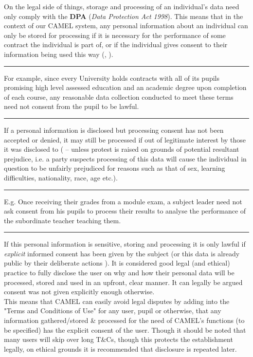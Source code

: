 On the legal side of things, storage and processing of an individual’s data need only comply with the \textbf{DPA} (\textit{Data Protection Act 1998}). This means that in the context of our CAMEL system, any personal information about an individual can only be stored for processing if it is necessary for the performance of some contract the individual is part of, or if the individual gives consent to their information being used this way (\cite{DPA:tDPP:S1}, \cite{DPA:tDPP:S2}).
\vspace{0.35cm} \hrule {\raggedleft \scriptsize For example, since every University holds contracts with all of its pupils promising high level assessed education and an academic degree upon completion of each course, any reasonable data collection conducted to meet these terms need not consent from the pupil to be lawful.\par} \vspace{0.35cm} \hrule
If a personal information is disclosed but processing consent has not been accepted or denied, it may still be processed if out of legitimate interest by those it was disclosed to (\cite{DPA:tDPP:S2} -- unless protest is raised on grounds of potential resultant prejudice, i.e. a party suspects processing of this data will cause the individual in question to be unfairly prejudiced for reasons such as that of sex, learning difficulties, nationality, race, age etc.).
\vspace{0.35cm} \hrule {\raggedleft \scriptsize E.g. Once receiving their grades from a module exam, a subject leader need not ask consent from his pupils to process their results to analyse the performance of the subordinate teacher teaching them.\par} \vspace{0.35cm} \hrule
If this personal information is sensitive, storing and processing it is only lawful if \emph{explicit} informed consent has been given by the subject (or this data is already public by their deliberate actions \cite{DPA:tDPP:S3}). It is considered good legal (and ethical) practice to fully disclose the user on why and how their personal data will be processed, stored and used in an upfront, clear manner. It can legally be argued consent was not given explicitly enough otherwise.
\\This means that CAMEL can easily avoid legal disputes by adding into the "Terms and Conditions of Use" for any user, pupil or otherwise, that any information gathered/stored \& processed for the need of CAMEL’s functions (to be specified) has the explicit consent of the user. Though it should be noted that many users will skip over long T\&Cs, though this protects the establishment legally, on ethical grounds it is recommended that disclosure is repeated later.
